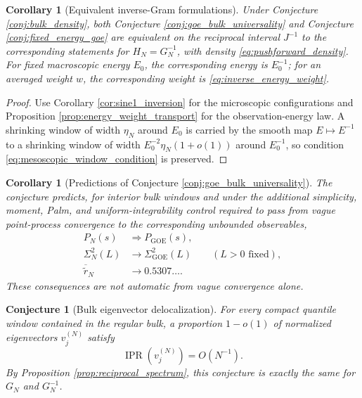 \documentclass[11pt]{amsart}
\numberwithin{equation}{section}
\theoremstyle{plain}
\newtheorem{corollary}[theorem]{Corollary}
\newtheorem{conjecture}[theorem]{Conjecture}
\theoremstyle{definition}
\theoremstyle{remark}
\newcommand{\IPR}{\operatorname{IPR}}
\newcommand{\GOE}{\mathrm{GOE}}
\begin{document}
\begin{corollary}[Equivalent inverse-Gram formulations]
\label{cor:inverse_goe_equivalence}
Under Conjecture \ref{conj:bulk_density}, both Conjecture \ref{conj:goe_bulk_universality} and Conjecture \ref{conj:fixed_energy_goe} are equivalent on the reciprocal interval $J^{-1}$ to the corresponding statements for $H_N=G_N^{-1}$, with density \eqref{eq:pushforward_density}.  For fixed macroscopic energy $E_0$, the corresponding energy is $E_0^{-1}$; for an averaged weight $w$, the corresponding weight is \eqref{eq:inverse_energy_weight}.
\end{corollary}

\begin{proof}
Use Corollary \ref{cor:sine1_inversion} for the microscopic configurations and Proposition \ref{prop:energy_weight_transport} for the observation-energy law.  A shrinking window of width $\eta_N$ around $E_0$ is carried by the smooth map $E\mapsto E^{-1}$ to a shrinking window of width $E_0^{-2}\eta_N(1+o(1))$ around $E_0^{-1}$, so condition \eqref{eq:mesoscopic_window_condition} is preserved.
\end{proof}

\begin{corollary}[Predictions of Conjecture \ref{conj:goe_bulk_universality}]
\label{cor:goe_predictions}
The conjecture predicts, for interior bulk windows and under the additional simplicity, moment, Palm, and uniform-integrability control required to pass from vague point-process convergence to the corresponding unbounded observables,
\begin{align}
P_N(s)&\Longrightarrow P_{\GOE}(s),
\label{eq:predicted_spacing}\\
\Sigma_N^2(L)&\longrightarrow\Sigma_{\GOE}^2(L)
\qquad(L>0\text{ fixed}),
\label{eq:predicted_number_variance}\\
\overline{\widetilde r}_N&\longrightarrow0.5307\ldots.
\label{eq:predicted_gap_ratio}
\end{align}
These consequences are not automatic from vague convergence alone.
\end{corollary}

\begin{conjecture}[Bulk eigenvector delocalization]
\label{conj:bulk_delocalization}
For every compact quantile window contained in the regular bulk, a proportion $1-o(1)$ of normalized eigenvectors $v_j^{(N)}$ satisfy
\begin{equation}
\IPR\!\left(v_j^{(N)}\right)=O(N^{-1}).
\label{eq:ipr_conjecture}
\end{equation}
By Proposition \ref{prop:reciprocal_spectrum}, this conjecture is exactly the same for $G_N$ and $G_N^{-1}$.
\end{conjecture}
\end{document}
